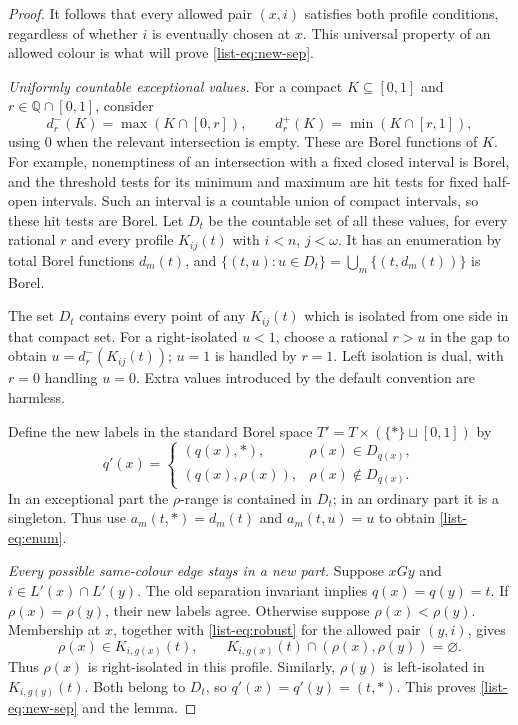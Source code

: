\documentclass[11pt,reqno]{amsart}
\theoremstyle{plain}
\theoremstyle{definition}
\theoremstyle{remark}
\newcommand{\Q}{\mathbb Q}
\begin{document}
\begin{proof}
It follows that every allowed pair $(x,i)$ satisfies both profile
conditions, regardless of whether $i$ is eventually chosen at $x$.
This universal property of an allowed colour is what will prove
\eqref{list-eq:new-sep}.

\smallskip
\noindent\emph{Uniformly countable exceptional values.}
For a compact $K\subseteq[0,1]$ and $r\in\Q\cap[0,1]$, consider
\[
d_r^-(K)=\max(K\cap[0,r]),\qquad
d_r^+(K)=\min(K\cap[r,1]),
\]
using $0$ when the relevant intersection is empty. These are Borel
functions of $K$. For example, nonemptiness of an intersection with a
fixed closed interval is Borel, and the threshold tests for its minimum
and maximum are hit tests for fixed half-open intervals. Such an interval
is a countable union of compact intervals, so these hit tests are Borel.
Let $D_t$ be the countable set of all these values, for every rational
$r$ and every profile $K_{ij}(t)$ with $i<n$, $j<\omega$. It has an
enumeration by
total Borel functions $d_m(t)$, and
$\{(t,u):u\in D_t\}=\bigcup_m\{(t,d_m(t))\}$ is Borel.

The set $D_t$ contains every point of any $K_{ij}(t)$ which is isolated
from one side in that compact set. For a right-isolated $u<1$, choose a
rational $r>u$ in the gap to obtain $u=d_r^-(K_{ij}(t))$; $u=1$ is handled
by $r=1$. Left isolation is dual, with $r=0$ handling $u=0$.
Extra values introduced by the default convention are harmless.

Define the new labels in the standard Borel space
$T'=T\times(\{\ast\}\sqcup[0,1])$ by
\begin{equation*}
q'(x)=
\begin{cases}
(q(x),\ast),&\rho(x)\in D_{q(x)},\\
(q(x),\rho(x)),&\rho(x)\notin D_{q(x)}.
\end{cases}
\end{equation*}
In an exceptional part the $\rho$-range is contained in $D_t$; in an
ordinary part it is a singleton. Thus use
$a_m(t,\ast)=d_m(t)$ and $a_m(t,u)=u$ to obtain \eqref{list-eq:enum}.

\smallskip
\noindent\emph{Every possible same-colour edge stays in a new part.}
Suppose $xGy$ and $i\in L'(x)\cap L'(y)$. The old separation invariant
implies $q(x)=q(y)=t$. If $\rho(x)=\rho(y)$, their new labels agree.
Otherwise suppose $\rho(x)<\rho(y)$. Membership at $x$, together with
\eqref{list-eq:robust} for the allowed pair $(y,i)$, gives
\[
\rho(x)\in K_{i,g(x)}(t),\qquad
K_{i,g(x)}(t)\cap(\rho(x),\rho(y))=\varnothing.
\]
Thus $\rho(x)$ is right-isolated in this profile. Similarly,
$\rho(y)$ is left-isolated in $K_{i,g(y)}(t)$. Both belong to $D_t$, so
$q'(x)=q'(y)=(t,\ast)$. This proves \eqref{list-eq:new-sep} and the lemma.
\end{proof}
\end{document}
